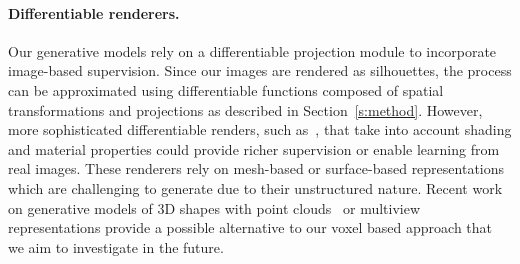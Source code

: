 \paragraph{Differentiable renderers.} 
Our generative models rely on a
differentiable projection module to incorporate image-based supervision.
Since our images are rendered as silhouettes, the process
can be approximated using differentiable functions composed of spatial
transformations and projections as described in Section~\ref{s:method}. 
However, more sophisticated differentiable renders, such as~\cite{nmr,Liu18,dmc}, that take into
account shading and material properties could provide richer
supervision or enable learning from real images.
These renderers rely on mesh-based or surface-based representations which are
challenging to generate due to their unstructured nature.
Recent work on generative models of 3D shapes with point
clouds~\cite{lin18,mrt,gadelha3d17,psg,atlasnet,latentpc} or multiview~\cite{lun17,tatarchenko2016multi} representations
provide a possible alternative to our voxel based approach that we aim
to investigate in the future.
